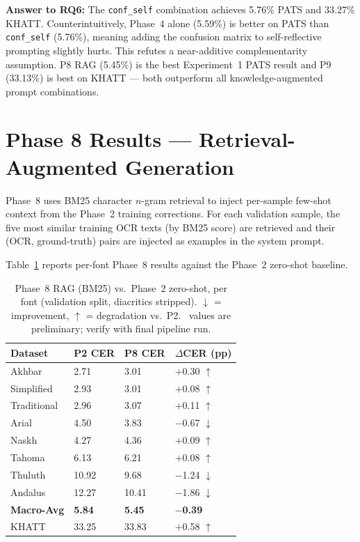 \textbf{Answer to RQ6:} The \texttt{conf\_self} combination achieves 5.76\%
PATS and 33.27\% KHATT. Counterintuitively, Phase~4 alone (5.59\%) is better
on PATS than \texttt{conf\_self} (5.76\%), meaning adding the confusion matrix
to self-reflective prompting slightly hurts. This refutes a near-additive
complementarity assumption. P8 RAG (5.45\%) is the best Experiment~1 PATS
result and P9 (33.13\%) is best on KHATT --- both outperform all
knowledge-augmented prompt combinations.

\section{Phase 8 Results --- Retrieval-Augmented Generation}
\label{sec:res_phase8}

Phase~8 uses BM25 character $n$-gram retrieval to inject per-sample few-shot
context from the Phase~2 training corrections. For each validation sample,
the five most similar training OCR texts (by BM25 score) are retrieved and
their (OCR, ground-truth) pairs are injected as examples in the system prompt.

Table~\ref{tab:p8_per_font} reports per-font Phase~8 results against the
Phase~2 zero-shot baseline.

\begin{table}[htbp]
  \centering
  \caption{Phase~8 RAG (BM25) vs.\ Phase~2 zero-shot, per font (validation
           split, diacritics stripped). $\downarrow$ = improvement,
           $\uparrow$ = degradation vs.\ P2.
           \dag~values are preliminary; verify with final pipeline run.}
  \label{tab:p8_per_font}
  \begin{tabularx}{\textwidth}{lXXX}
    \toprule
    \textbf{Dataset} & \textbf{P2 CER} & \textbf{P8 CER}
      & \textbf{$\Delta$CER (pp)} \\
    \midrule
    Akhbar       &  2.71 &  3.01 & $+$0.30 $\uparrow$ \\
    Simplified   &  2.93 &  3.01 & $+$0.08 $\uparrow$ \\
    Traditional  &  2.96 &  3.07 & $+$0.11 $\uparrow$ \\
    Arial        &  4.50 &  3.83 & $-$0.67 $\downarrow$ \\
    Naskh        &  4.27 &  4.36 & $+$0.09 $\uparrow$ \\
    Tahoma       &  6.13 &  6.21 & $+$0.08 $\uparrow$ \\
    Thuluth      & 10.92 &  9.68 & $-$1.24 $\downarrow$ \\
    Andalus      & 12.27 & 10.41 & $-$1.86 $\downarrow$ \\
    \midrule
    \textbf{Macro-Avg} & \textbf{5.84} & \textbf{5.45} & \textbf{$-$0.39} \\
    \midrule
    KHATT        & 33.25 & 33.83 & $+$0.58 $\uparrow$ \\
    \bottomrule
  \end{tabularx}
\end{table}

